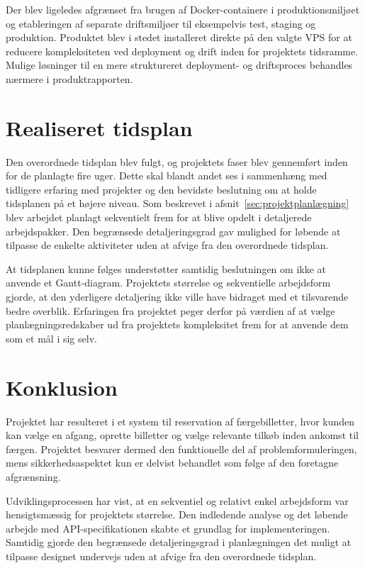 \documentclass[a4paper, 11pt]{article}
\begin{document}
Der blev ligeledes afgrænset fra brugen af Docker-containere i produktionsmiljøet og
etableringen af separate driftsmiljøer til eksempelvis test, staging og produktion.
Produktet blev i stedet installeret direkte på den valgte VPS for at reducere kompleksiteten
ved deployment og drift inden for projektets tidsramme. Mulige løsninger til en mere
struktureret deployment- og driftsproces behandles nærmere i produktrapporten.

\section{Realiseret tidsplan}

Den overordnede tidsplan blev fulgt, og projektets faser blev gennemført inden for de
planlagte fire uger. Dette skal blandt andet ses i sammenhæng med tidligere erfaring med
projekter og den bevidste beslutning om at holde tidsplanen på et højere niveau.
Som beskrevet i afsnit~\ref{sec:projektplanlægning} blev arbejdet planlagt sekventielt frem
for at blive opdelt i detaljerede arbejdspakker. Den begrænsede detaljeringsgrad gav
mulighed for løbende at tilpasse de enkelte aktiviteter uden at afvige fra den overordnede
tidsplan.

At tidsplanen kunne følges understøtter samtidig beslutningen om ikke at anvende et
Gantt-diagram. Projektets størrelse og sekventielle arbejdsform gjorde, at den yderligere
detaljering ikke ville have bidraget med et tilsvarende bedre overblik. Erfaringen fra
projektet peger derfor på værdien af at vælge planlægningsredskaber ud fra projektets
kompleksitet frem for at anvende dem som et mål i sig selv.

\section{Konklusion}

Projektet har resulteret i et system til reservation af færgebilletter, hvor kunden kan
vælge en afgang, oprette billetter og vælge relevante tilkøb inden ankomst til færgen.
Projektet besvarer dermed den funktionelle del af problemformuleringen, mens
sikkerhedsaspektet kun er delvist behandlet som følge af den foretagne afgrænsning.

Udviklingsprocessen har vist, at en sekventiel og relativt enkel arbejdsform var
hensigtsmæssig for projektets størrelse. Den indledende analyse og det løbende arbejde med
API-specifikationen skabte et grundlag for implementeringen.
Samtidig gjorde den begrænsede detaljeringsgrad
i planlægningen det muligt at tilpasse designet undervejs uden at afvige fra den overordnede
tidsplan.
\end{document}
